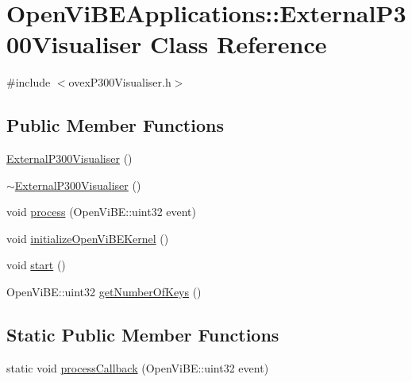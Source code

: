 \hypertarget{classOpenViBEApplications_1_1ExternalP300Visualiser}{
\section{OpenViBEApplications::ExternalP300Visualiser Class Reference}
\label{classOpenViBEApplications_1_1ExternalP300Visualiser}
}


{\ttfamily \#include $<$ovexP300Visualiser.h$>$}

\subsection*{Public Member Functions}
\begin{DoxyCompactItemize}
\item 
\hyperlink{classOpenViBEApplications_1_1ExternalP300Visualiser_a70ebbe1061d6b8c7caf20e358f39ca11}{ExternalP300Visualiser} ()
\item 
\hyperlink{classOpenViBEApplications_1_1ExternalP300Visualiser_a2f7bbf7e8d04f23464cc02460864bac6}{$\sim$ExternalP300Visualiser} ()
\item 
void \hyperlink{classOpenViBEApplications_1_1ExternalP300Visualiser_ad638eed494b89345ea6c05f66d2e6b68}{process} (OpenViBE::uint32 event)
\item 
void \hyperlink{classOpenViBEApplications_1_1ExternalP300Visualiser_ad741899fb86d35ee9696c2d37b9a4603}{initializeOpenViBEKernel} ()
\item 
void \hyperlink{classOpenViBEApplications_1_1ExternalP300Visualiser_aa884bd3c7b07b85cbad627ffc030f65f}{start} ()
\item 
OpenViBE::uint32 \hyperlink{classOpenViBEApplications_1_1ExternalP300Visualiser_aaaae01aba68b3fe6d4c83883713c52c1}{getNumberOfKeys} ()
\end{DoxyCompactItemize}
\subsection*{Static Public Member Functions}
\begin{DoxyCompactItemize}
\item 
static void \hyperlink{classOpenViBEApplications_1_1ExternalP300Visualiser_abb72f652c92905d850ef53d45e3b07cf}{processCallback} (OpenViBE::uint32 event)
\end{DoxyCompactItemize}
